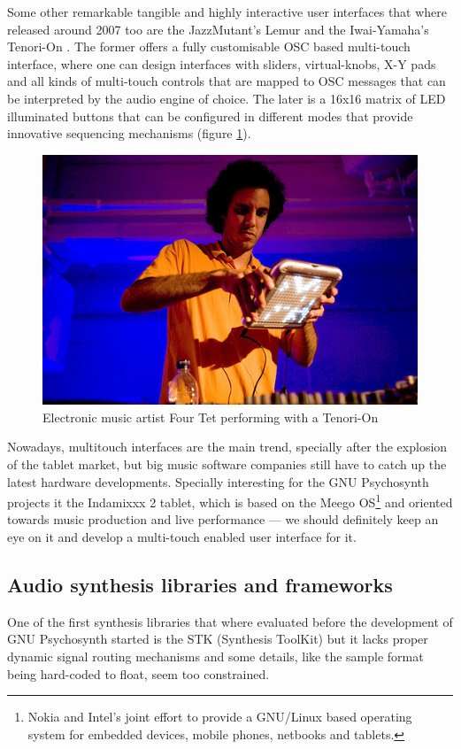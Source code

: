 Some other remarkable tangible and highly interactive user interfaces
that where released around 2007 too are the JazzMutant's Lemur and the
Iwai-Yamaha’s Tenori-On \cite{nishibori06tenorion}. The former offers
a fully customisable OSC based multi-touch interface, where one can
design interfaces with sliders, virtual-knobs, X-Y pads and all kinds
of multi-touch controls that are mapped to OSC messages that can be
interpreted by the audio engine of choice. The later is a 16x16 matrix
of LED illuminated buttons that can be configured in different modes
that provide innovative sequencing mechanisms (figure
\ref{fig:tenorion}).

\begin{figure}[h!]
\centering
\includegraphics[width=.7\textwidth]{pic/tenorion.jpg}
\caption{Electronic music artist Four Tet performing with a Tenori-On}
\label{fig:tenorion}
\end{figure}

Nowadays, multitouch interfaces are the main trend, specially after
the explosion of the tablet market, but big music software companies
still have to catch up the latest hardware developments. Specially
interesting for the GNU Psychosynth projects it the Indamixxx 2
tablet, which is based on the Meego OS\footnote{Nokia and Intel's
  joint effort to provide a GNU/Linux based operating system for
  embedded devices, mobile phones, netbooks and tablets.} and oriented
towards music production and live performance --- we should definitely
keep an eye on it and develop a multi-touch enabled user interface for
it.

\subsection{Audio synthesis libraries and frameworks}
\label{sec:dsl}

One of the first synthesis libraries that where evaluated before the
development of GNU Psychosynth started is the STK (Synthesis ToolKit)
\cite{scavone05rtmidi} but it lacks proper dynamic signal routing
mechanisms and some details, like the sample format being hard-coded
to float, seem too constrained.

